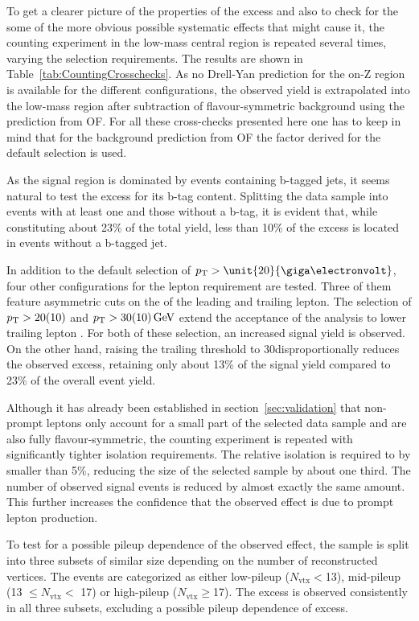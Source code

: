 To get a clearer picture of the properties of the excess and also to check for the some of the more obvious possible systematic effects that might cause it, the counting experiment in the low-mass central region is repeated several times, varying the selection requirements. The results are shown in Table~\ref{tab:CountingCrosschecks}. As no Drell-Yan prediction for the on-Z region is available for the different configurations, the observed yield is extrapolated into the low-mass region after subtraction of flavour-symmetric background using the prediction from OF. For all these cross-checks presented here one has to keep in mind that for the background prediction from OF the \Rsfof factor derived for the default selection is used.

As the signal region is dominated by events containing b-tagged jets, it seems natural to test the excess for its b-tag content. Splitting the data sample into events with at least one and those without a b-tag, it is evident that, while constituting about 23\% of the total yield, less than 10\% of the excess is located in events without a b-tagged jet. 

In addition to the default selection of $\pt > \unit{20}{\giga\electronvolt}$, four other configurations for the lepton \pt requirement are tested. Three of them feature asymmetric cuts on the \pt of the leading and trailing lepton. The selection of $p_{\mathrm{T}} > 20(10)$ and $ p_{\mathrm{T}} > 30(10)\,\text{Ge\hspace{-.08em}V}$ extend the acceptance of the analysis to lower trailing lepton \pt. For both of these selection, an increased signal yield is observed. On the other hand, raising the trailing \pt threshold to 30\GeV disproportionally reduces the observed excess, retaining only about 13\% of the signal yield compared to 23\% of the overall event yield. 

Although it has already been established in section~\ref{sec:validation} that non-prompt leptons only account for a small part of the selected data sample and are also fully flavour-symmetric, the counting experiment is repeated with significantly tighter isolation requirements. The relative isolation is required to by smaller than 5\%, reducing the size of the selected sample by about one third. The number of observed signal events is reduced by almost exactly the same amount. This further increases the confidence that the observed effect is due to prompt lepton production.

To test for a possible pileup dependence of the observed effect, the sample is split into three subsets of similar size depending on the number of reconstructed vertices. The events are categorized as either low-pileup ($N_{\mathrm{vtx}} < $13), mid-pileup (13 $\leq N_{\mathrm{vtx}} <$ 17) or high-pileup ($N_{\mathrm{vtx}} \geq $17). The excess is observed consistently in all three subsets, excluding a possible pileup dependence of excess. 

